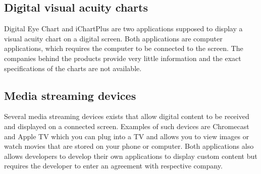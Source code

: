 \documentclass[12pt,a4paper,notitlepage]{report}
\begin{document}
\subsection{Digital visual acuity charts}
Digital Eye Chart \cite{digitaleyechart} and iChartPlus \cite{ichartplus} are two applications supposed to display a visual acuity chart on a digital screen. Both applications are computer applications, which requires the computer to be connected to the screen. The companies behind the products provide very little information and the exact specifications of the charts are not available.

\subsection{Media streaming devices}
Several media streaming devices exists that allow digital content to be received and displayed on a connected screen. Examples of such devices are Chromecast \cite{chromecast} and Apple TV \cite{appletv} which you can plug into a TV and allows you to view images or watch movies that are stored on your phone or computer. Both applications also allows developers to develop their own applications to display custom content but requires the developer to enter an agreement with respective company.
\end{document}
